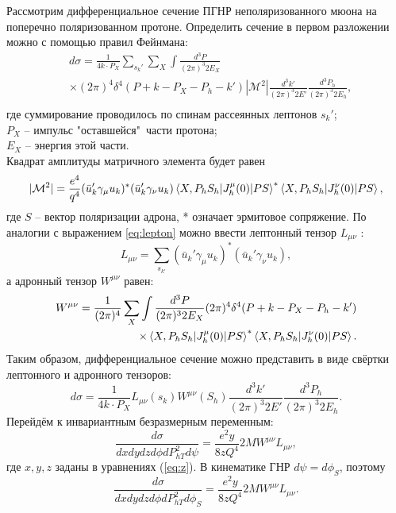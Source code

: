 \documentclass{extreport}
\begin{document}
Рассмотрим дифференциальное сечение ПГНР неполяризованного мюона на поперечно поляризованном протоне. Определить сечение в первом разложении можно с помощью правил Фейнмана:
\begin{equation}
\begin{split}
	& d\sigma = \frac{1}{4k\cdot P_X} \sum_{s_k'} \sum_X \int \frac{d^3 P}{(2\pi)^3 2 E_X} \\
	& \times (2\pi)^4 \delta^4(P+k-P_X - P_h - k')|\mathcal{M}^2| \frac{d^3 k'}{(2\pi)^3 2E'}\frac{d^3 P_h}{(2\pi)^3 2E_h}, \\
\end{split}
\end{equation}
где суммирование проводилось по спинам рассеянных лептонов $s_k'$; \\ $P_X$ -- импульс "оставшейся"\ части протона; \\ $E_X$ -- энергия этой части. \\ Квадрат амплитуды матричного элемента будет равен
\begin{equation}
		|\mathcal{M}^2| = \frac{e^4}{q^4} (\bar{u}_k'\gamma_\mu u_k)^{*}(\bar{u}_k'\gamma_\nu u_k)  \braket{X, P_h S_h | J_h^\mu (0) | PS}^{*} \braket{X, P_h S_h | J_h^\nu (0) | PS},
\end{equation}
где $S$ -- вектор поляризации адрона, * означает эрмитовое сопряжение. По аналогии с выражением \ref{eq:lepton} можно ввести лептонный тензор $L_{\mu \nu}$ \cite{Barone_2002}:
\begin{equation}
	L_{\mu \nu} = \sum_{s_{k'}} (\bar{u}_k'\gamma_\mu u_k)^{*}(\bar{u}_k'\gamma_\nu u_k),
\end{equation}
а адронный тензор $W^{\mu \nu}$ равен:
\begin{equation}
	\begin{split}
		W^{\mu \nu} = \frac{1}{(2\pi)^4} \sum_X \int \frac{d^3 P}{(2\pi)^3 2 E_X} (2\pi)^4 \delta^4(P+k-P_X - P_h - k') \\
		\times \braket{X, P_h S_h | J_h^\mu (0) | PS}^{*} \braket{X, P_h S_h | J_h^\nu (0) | PS}.
	\end{split}
\end{equation}
Таким образом, дифференциальное сечение можно представить в виде свёртки лептонного и адронного тензоров:
\begin{equation}
	d\sigma = \frac{1}{4k\cdot P_X} L_{\mu\nu}(s_k) W^{\mu \nu}(S_h) \frac{d^3 k'}{(2\pi)^3 2E'}\frac{d^3 P_h}{(2\pi)^3 2E_h}.
\end{equation}
Перейдём к инвариантным безразмерным переменным:
\begin{equation}
	\frac{d\sigma}{dxdydzd\phi dP^2_{hT}d\psi} = \frac{e^2 y}{8zQ^4}2MW^{\mu\nu}L_{\mu\nu},
\end{equation}
где $x,y,z$ заданы в уравнениях (\ref{eq:z}). В кинематике ГНР $d\psi = d\phi_S$, поэтому
\begin{equation}
		\frac{d\sigma}{dxdydzd\phi dP^2_{hT}d\phi_S} = \frac{e^2 y}{8zQ^4}2MW^{\mu\nu}L_{\mu\nu}.
\end{equation}
\end{document}
